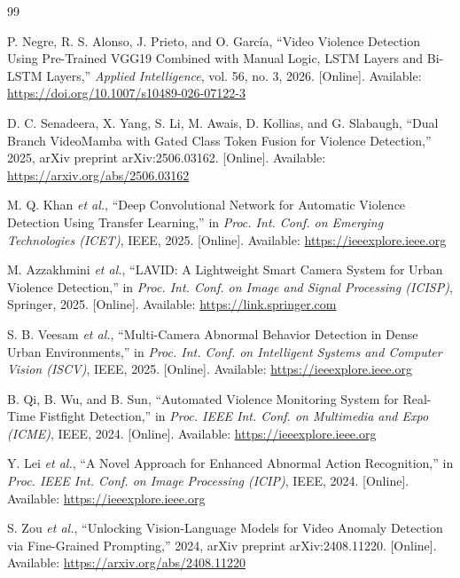 
\begin{thebibliography}{99}

P. Negre, R. S. Alonso, J. Prieto, and O. Garc{\'i}a, 
``Video Violence Detection Using Pre-Trained {VGG19} Combined with Manual Logic, {LSTM} Layers and {Bi-LSTM} Layers,'' 
\textit{Applied Intelligence}, vol. 56, no. 3, 2026. 
[Online]. Available: \url{https://doi.org/10.1007/s10489-026-07122-3}

D. C. Senadeera, X. Yang, S. Li, M. Awais, D. Kollias, and G. Slabaugh, 
``Dual Branch {VideoMamba} with Gated Class Token Fusion for Violence Detection,'' 
2025, arXiv preprint arXiv:2506.03162. 
[Online]. Available: \url{https://arxiv.org/abs/2506.03162}

M. Q. Khan \textit{et al.}, 
``Deep Convolutional Network for Automatic Violence Detection Using Transfer Learning,'' 
in \textit{Proc. Int. Conf. on Emerging Technologies (ICET)}, IEEE, 2025. 
[Online]. Available: \url{https://ieeexplore.ieee.org}

M. Azzakhmini \textit{et al.}, 
``{LAVID}: A Lightweight Smart Camera System for Urban Violence Detection,'' 
in \textit{Proc. Int. Conf. on Image and Signal Processing (ICISP)}, Springer, 2025. 
[Online]. Available: \url{https://link.springer.com}

S. B. Veesam \textit{et al.}, 
``Multi-Camera Abnormal Behavior Detection in Dense Urban Environments,'' 
in \textit{Proc. Int. Conf. on Intelligent Systems and Computer Vision (ISCV)}, IEEE, 2025. 
[Online]. Available: \url{https://ieeexplore.ieee.org}

B. Qi, B. Wu, and B. Sun, 
``Automated Violence Monitoring System for Real-Time Fistfight Detection,'' 
in \textit{Proc. IEEE Int. Conf. on Multimedia and Expo (ICME)}, IEEE, 2024. 
[Online]. Available: \url{https://ieeexplore.ieee.org}

Y. Lei \textit{et al.}, 
``A Novel Approach for Enhanced Abnormal Action Recognition,'' 
in \textit{Proc. IEEE Int. Conf. on Image Processing (ICIP)}, IEEE, 2024. 
[Online]. Available: \url{https://ieeexplore.ieee.org}

S. Zou \textit{et al.}, 
``Unlocking Vision-Language Models for Video Anomaly Detection via Fine-Grained Prompting,'' 
2024, arXiv preprint arXiv:2408.11220. 
[Online]. Available: \url{https://arxiv.org/abs/2408.11220}


\end{thebibliography}
